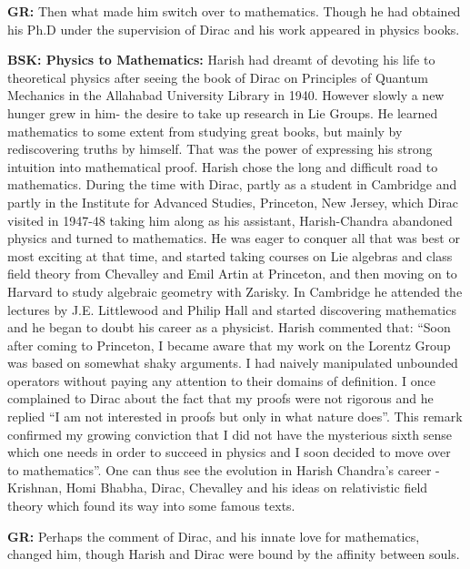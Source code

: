 \textbf{GR:} Then what made him switch over to mathematics. Though he had obtained his Ph.D under the supervision of Dirac and his work appeared in physics books.

\textbf{BSK: Physics to Mathematics:}  Harish had dreamt of devoting his life to theoretical physics after seeing the book of Dirac on Principles of Quantum Mechanics in the Allahabad University Library in 1940. However slowly a new hunger grew in him- the desire to take up research in Lie Groups. He learned mathematics to some extent from studying great books, but mainly by rediscovering truths by himself. That was the power of expressing his strong intuition into mathematical proof. Harish chose the long and difficult road to mathematics. During the time with Dirac, partly as a student in Cambridge and partly in the Institute for Advanced Studies, Princeton, New Jersey, which Dirac visited in 1947-48 taking him along as his assistant, Harish-Chandra abandoned physics and turned to mathematics. He was eager to conquer all that was best or most exciting at that time, and started taking courses on Lie algebras and class field theory from Chevalley and Emil Artin at Princeton, and then moving on to Harvard to study algebraic geometry with Zarisky. In Cambridge he attended the lectures by J.E. Littlewood and Philip Hall and started discovering mathematics and he began to doubt his career as a physicist. Harish commented that: “Soon after coming to Princeton, I became aware that my work on the Lorentz Group was based on somewhat shaky arguments.  I had naively manipulated unbounded operators without paying any attention to their domains of definition. I once complained to Dirac about the fact that my proofs were not rigorous and he replied “I am not interested in proofs but only in what nature does”.  This remark confirmed my growing conviction that I did not have the mysterious sixth sense which one needs in order to succeed in physics and I soon decided to move over to mathematics”. One can thus see the evolution in Harish Chandra’s career - Krishnan, Homi Bhabha, Dirac, Chevalley and his ideas on relativistic field theory which found its way into some famous texts.

\textbf{GR:} Perhaps the comment of Dirac, and his innate love for mathematics, changed him, though Harish and Dirac were bound by the affinity between souls.

